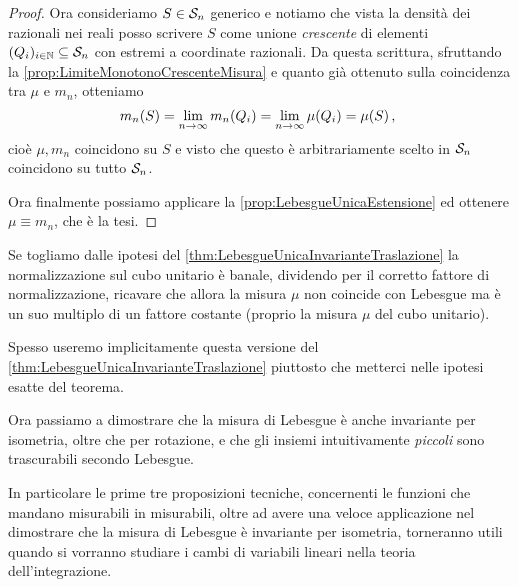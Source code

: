 \begin{proof}
	Ora consideriamo $S\in\S_n$ generico e notiamo che vista la densità dei razionali nei reali posso scrivere $S$ come unione \emph{crescente} di elementi $(Q_i)_{i\in\N}\subseteq \S_n$ con estremi a coordinate razionali. 
	Da questa scrittura, sfruttando la \cref{prop:LimiteMonotonoCrescenteMisura} e quanto già ottenuto sulla coincidenza tra $\mu$ e $m_n$, otteniamo
	\begin{equation*}
		m_n(S)=\lim_{n\to\infty}m_n(Q_i)=\lim_{n\to\infty}\mu(Q_i)=\mu(S) \virgola
	\end{equation*}
	cioè $\mu,m_n$ coincidono su $S$ e visto che questo è arbitrariamente scelto in $\S_n$ coincidono su tutto $\S_n$.
	
	Ora finalmente possiamo applicare la \cref{prop:LebesgueUnicaEstensione} ed ottenere $\mu\equiv m_n$, che è la tesi.
\end{proof}
\begin{remark}\label{nota:LebesgueInvarianteNormalizzazione}
	Se togliamo dalle ipotesi del \cref{thm:LebesgueUnicaInvarianteTraslazione} la normalizzazione sul cubo unitario è banale, dividendo per il corretto fattore di normalizzazione, ricavare che allora la misura $\mu$ non coincide con Lebesgue ma è un suo multiplo di un fattore costante (proprio la misura $\mu$ del cubo unitario).
	
	Spesso useremo implicitamente questa versione del \cref{thm:LebesgueUnicaInvarianteTraslazione} piuttosto che metterci nelle ipotesi esatte del teorema.
\end{remark}



Ora passiamo a dimostrare che la misura di Lebesgue è anche invariante per isometria, oltre che per rotazione, e che gli insiemi intuitivamente \emph{piccoli} sono trascurabili secondo Lebesgue.

In particolare le prime tre proposizioni tecniche, concernenti le funzioni che mandano misurabili in misurabili, oltre ad avere una veloce applicazione nel dimostrare che la misura di Lebesgue è invariante per isometria, torneranno utili quando si vorranno studiare i cambi di variabili lineari nella teoria dell'integrazione.

